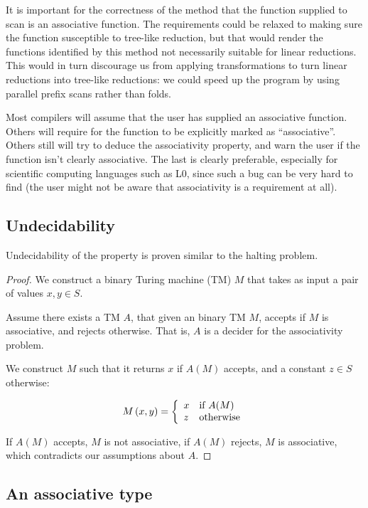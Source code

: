 It is important for the correctness of the method that the function supplied to
scan is an associative function. The requirements could be relaxed to making
sure the function susceptible to tree-like reduction, but that would render the
functions identified by this method not necessarily suitable for linear
reductions. This would in turn discourage us from applying transformations to
turn linear reductions into tree-like reductions: we could speed up the program
by using parallel prefix scans rather than folds.

Most compilers will assume that the user has supplied an associative function.
Others will require for the function to be explicitly marked as
``associative''. Others still will try to deduce the associativity property,
and warn the user if the function isn't clearly associative. The last is
clearly preferable, especially for scientific computing languages such as L0,
since such a bug can be very hard to find (the user might not be aware that
associativity is a requirement at all).

\subsection{Undecidability}

Undecidability of the property is proven similar to the halting problem.

\begin{proof} We construct a binary Turing machine (TM) $M$ that takes as input
a pair of values $x,y\in S$.

Assume there exists a TM $A$, that given an binary TM $M$, accepts if $M$ is
associative, and rejects otherwise. That is, $A$ is a decider for the
associativity problem.

We construct $M$ such that it returns $x$ if $A(M)$ accepts, and a constant
$z\in S$ otherwise:

\[M\left({x,y}\right) = \left\{ \begin{array}{l l} x & \text{if $A(M)$} \\ z &
\text{otherwise} \end{array} \right.\]

If $A(M)$ accepts, $M$ is not associative, if $A(M)$ rejects, $M$ is
associative, which contradicts our assumptions about $A$. \end{proof}

\subsection{An associative type}

